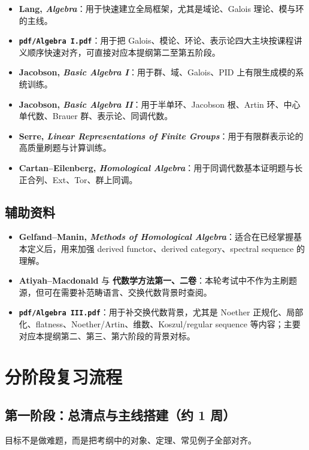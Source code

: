 \documentclass[12pt,a4paper]{ctexart}
\begin{document}
\begin{itemize}
  \item \textbf{Lang, \emph{Algebra}}：用于快速建立全局框架，尤其是域论、Galois 理论、模与环的主线。
  \item \textbf{\texttt{pdf/Algebra I.pdf}}：用于把 Galois、模论、环论、表示论四大主块按课程讲义顺序快速对齐，可直接对应本提纲第二至第五阶段。
  \item \textbf{Jacobson, \emph{Basic Algebra I}}：用于群、域、Galois、PID 上有限生成模的系统训练。
  \item \textbf{Jacobson, \emph{Basic Algebra II}}：用于半单环、Jacobson 根、Artin 环、中心单代数、Brauer 群、表示论、同调代数。
  \item \textbf{Serre, \emph{Linear Representations of Finite Groups}}：用于有限群表示论的高质量刷题与计算训练。
  \item \textbf{Cartan--Eilenberg, \emph{Homological Algebra}}：用于同调代数基本证明题与长正合列、Ext、Tor、群上同调。
\end{itemize}

\subsection{辅助资料}

\begin{itemize}
  \item \textbf{Gelfand--Manin, \emph{Methods of Homological Algebra}}：适合在已经掌握基本定义后，用来加强 derived functor、derived category、spectral sequence 的理解。
  \item \textbf{Atiyah--Macdonald} 与 \textbf{代数学方法第一、二卷}：本轮考试中不作为主刷题源，但可在需要补范畴语言、交换代数背景时查阅。
  \item \textbf{\texttt{pdf/Algebra III.pdf}}：用于补交换代数背景，尤其是 Noether 正规化、局部化、flatness、Noether/Artin、维数、Koszul/regular sequence 等内容；主要对应本提纲第二、第三、第六阶段的背景对标。
\end{itemize}

\section{分阶段复习流程}

\subsection{第一阶段：总清点与主线搭建（约 1 周）}

目标不是做难题，而是把考纲中的对象、定理、常见例子全部对齐。
\end{document}
